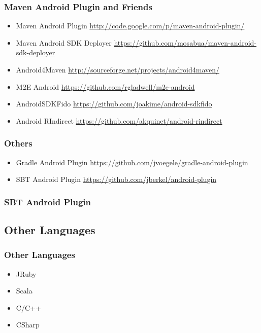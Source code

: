 \documentclass{beamer}
\begin{document}
    \begin{frame}
      \frametitle{Maven Android Plugin and Friends}
      \begin{itemize}
       \item Maven Android Plugin \url{http://code.google.com/p/maven-android-plugin/}
       \item Maven Android SDK Deployer \url{https://github.com/mosabua/maven-android-sdk-deployer}
       \item Android4Maven \url{http://sourceforge.net/projects/android4maven/}
       \item M2E Android \url{https://github.com/rgladwell/m2e-android}
       \item AndroidSDKFido \url{https://github.com/joakime/android-sdkfido}
       \item Android RIndirect \url{https://github.com/akquinet/android-rindirect}
      \end{itemize}

    \end{frame}

    \begin{frame}
      \frametitle{Others}
      \begin{itemize}
       \item Gradle Android Plugin \url{https://github.com/jvoegele/gradle-android-plugin}
       \item SBT Android Plugin \url{https://github.com/jberkel/android-plugin}
      \end{itemize}

    \end{frame}

    \begin{frame}
      \frametitle{SBT Android Plugin}
    \end{frame}

  \subsection{Other Languages}
    \begin{frame}
      \frametitle{Other Languages}
      \begin{itemize}
      \item JRuby
      \item Scala
      \item C/C++
      \item CSharp
      \end{itemize}
    \end{frame}
\end{document}
